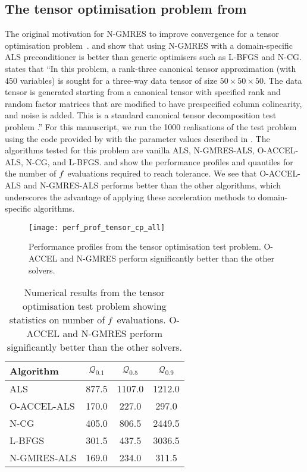 \documentclass[main.tex]{subfiles}
\begin{document}
\subsection{The tensor optimisation problem from \citeauthor{sterck2013steepest}}\label{subsec:tensor_optim}
The original motivation for N-GMRES to improve convergence for a
tensor optimisation problem~\cite{sterck2012nonlinear}.
\citet{sterck2012nonlinear} and \citet{sterck2013steepest} show that
using N-GMRES with a domain-specific ALS preconditioner is better than
generic optimisers such as L-BFGS and N-CG.
\citet{sterck2013steepest} states that ``In this problem, a rank-three
canonical tensor approximation (with 450 variables) is sought for a
three-way data tensor of size $50\times 50\times 50$. The data tensor
is generated starting from a canonical tensor with specified rank and
random factor matrices that are modified to have prespecified column
colinearity, and noise is added. This is a standard canonical tensor
decomposition test problem \citep{acar2011scalable}.''  For this
manuscript, we run the \num{1000} realisations of the test problem
using the code provided by \citet{sterck2013steepest} with the
parameter values described in .  The
algorithms tested for this problem are vanilla ALS, N-GMRES-ALS,
O-ACCEL-ALS, N-CG, and L-BFGS.   and
 show the performance profiles and
quantiles for the number of $f$ evaluations required to reach
tolerance.  We see that O-ACCEL-ALS and N-GMRES-ALS performs better
than the other algorithms, which underscores the advantage of applying
these acceleration methods to domain-specific algorithms.
\begin{figure}[htbp]
  \centering
  \texttt{[image: perf\_prof\_tensor\_cp\_all]}
  \caption{Performance profiles from the tensor optimisation test
    problem. O-ACCEL and N-GMRES perform significantly better than the
    other solvers.}\label{fig:perf_prof_tensor_cp_all}
\end{figure}

\begin{table}[hbtp]
  \centering
  \begin{tabular}{lS[table-auto-round,table-format=-1.0]
    S[table-auto-round,table-format=-1.0]
    S[table-auto-round,table-format=-1.0]}
    \toprule
    Algorithm&{$\mathcal{Q}_{0.1}$}&{$\mathcal{Q}_{0.5}$}&{$\mathcal{Q}_{0.9}$}\\
    \midrule
    ALS&877.5&1107.0&1212.0\\
    O-ACCEL-ALS&170.0&227.0&297.0\\
    N-CG&405.0&806.5&2449.5\\
    L-BFGS&301.5&437.5&3036.5\\
    N-GMRES-ALS&169.0&234.0&311.5\\
    \bottomrule
  \end{tabular}
  \caption{Numerical results from the tensor optimisation test
    problem showing statistics on number of $f$ evaluations. O-ACCEL and N-GMRES perform significantly better than the
    other solvers.}\label{tbl:quantiles_tensor_cp_all}
\end{table}
\end{document}
